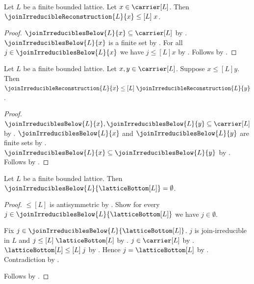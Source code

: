 \begin{proposition}\label{join_irreducible_reconstruction_below}
    Let $L$ be a finite bounded lattice.
    Let $x\in\carrier[L]$.
    Then $\joinIrreducibleReconstruction{L}{x}\mathrel{\leq[L]}x$.
\end{proposition}
\begin{proof}
    $\joinIrreduciblesBelow{L}{x}\subseteq\carrier[L]$ by
        .
    $\joinIrreduciblesBelow{L}{x}$ is a finite set by
        .
    For all $j\in\joinIrreduciblesBelow{L}{x}$ we have
        $j\mathrel{\leq[L]}x$ by .
    Follows by
        .
\end{proof}

\begin{proposition}\label{join_irreducible_reconstruction_monotone}
    Let $L$ be a finite bounded lattice.
    Let $x,y\in\carrier[L]$.
    Suppose $x\mathrel{\leq[L]}y$.
    Then $\joinIrreducibleReconstruction{L}{x}
        \mathrel{\leq[L]}\joinIrreducibleReconstruction{L}{y}$.
\end{proposition}
\begin{proof}
    $\joinIrreduciblesBelow{L}{x},\joinIrreduciblesBelow{L}{y}
        \subseteq\carrier[L]$ by
        .
    $\joinIrreduciblesBelow{L}{x}$ and
        $\joinIrreduciblesBelow{L}{y}$ are finite sets by
        .
    $\joinIrreduciblesBelow{L}{x}
        \subseteq\joinIrreduciblesBelow{L}{y}$ by
        .
    Follows by
        .
\end{proof}

\begin{proposition}\label{join_irreducibles_below_lattice_bottom_empty}
    Let $L$ be a finite bounded lattice.
    Then $\joinIrreduciblesBelow{L}{\latticeBottom[L]}=\emptyset$.
\end{proposition}
\begin{proof}
    $\leq[L]$ is antisymmetric by
        .
    Show for every $j\in\joinIrreduciblesBelow{L}{\latticeBottom[L]}$
        we have $j\in\emptyset$.
    \begin{subproof}
        Fix $j\in\joinIrreduciblesBelow{L}{\latticeBottom[L]}$.
        $j$ is join-irreducible in $L$ and
            $j\mathrel{\leq[L]}\latticeBottom[L]$ by
            .
        $j\in\carrier[L]$ by .
        $\latticeBottom[L]\mathrel{\leq[L]}j$ by
            .
        Hence $j=\latticeBottom[L]$ by .
        Contradiction by .
    \end{subproof}
    Follows by .
\end{proof}

